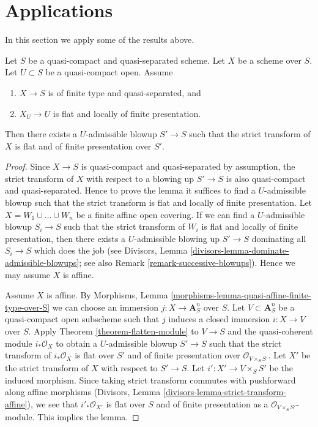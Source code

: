 \section{Applications}
\label{section-applications}

\noindent
In this section we apply some of the results above.

\begin{lemma}
\label{lemma-flat-after-blowing-up}
Let $S$ be a quasi-compact and quasi-separated scheme.
Let $X$ be a scheme over $S$.
Let $U \subset S$ be a quasi-compact open.
Assume
\begin{enumerate}
\item $X \to S$ is of finite type and quasi-separated, and
\item $X_U \to U$ is flat and locally of finite presentation.
\end{enumerate}
Then there exists a $U$-admissible blowup $S' \to S$ such that
the strict transform of $X$ is flat and of finite presentation
over $S'$.
\end{lemma}

\begin{proof}
Since $X \to S$ is quasi-compact and quasi-separated by assumption,
the strict transform of $X$ with respect to a blowing up $S' \to S$
is also quasi-compact and quasi-separated. Hence to prove the lemma
it suffices to find a $U$-admissible blowup such that the strict
transform is flat and locally of finite presentation.
Let $X = W_1 \cup \ldots \cup W_n$ be a finite affine open covering.
If we can find a $U$-admissible blowup $S_i \to S$ such that the
strict transform of $W_i$ is flat and locally of finite presentation,
then there exists a $U$-admissible blowing up $S' \to S$ dominating
all $S_i \to S$ which does the job (see
Divisors, Lemma \ref{divisors-lemma-dominate-admissible-blowups};
see also Remark \ref{remark-successive-blowups}).
Hence we may assume $X$ is affine.

\medskip\noindent
Assume $X$ is affine. By
Morphisms, Lemma \ref{morphisms-lemma-quasi-affine-finite-type-over-S}
we can choose an immersion $j : X \to \mathbf{A}^n_S$ over $S$.
Let $V \subset \mathbf{A}^n_S$ be a quasi-compact open subscheme
such that $j$ induces a closed immersion $i : X \to V$ over $S$. Apply
Theorem \ref{theorem-flatten-module}
to $V \to S$ and the quasi-coherent module $i_*\mathcal{O}_X$
to obtain a $U$-admissible blowup $S' \to S$ such that the strict
transform of $i_*\mathcal{O}_X$ is flat over $S'$ and of finite presentation
over $\mathcal{O}_{V \times_S S'}$. Let $X'$ be the strict transform
of $X$ with respect to $S' \to S$. Let $i' : X' \to V \times_S S'$
be the induced morphism.
Since taking strict transform commutes with pushforward along affine
morphisms (Divisors, Lemma \ref{divisors-lemma-strict-transform-affine}),
we see that $i'_*\mathcal{O}_{X'}$ is flat over $S$ and of
finite presentation as a $\mathcal{O}_{V \times_S S'}$-module.
This implies the lemma.
\end{proof}

